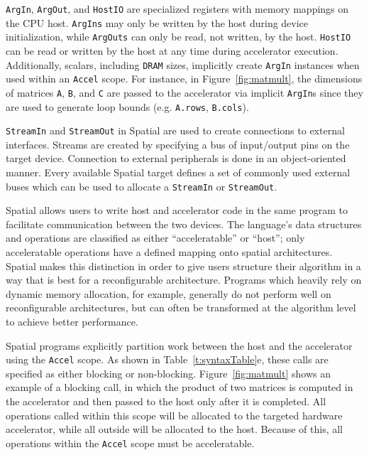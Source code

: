 \texttt{\small{ArgIn}}, \texttt{\small{ArgOut}}, and \texttt{\small{HostIO}} are specialized registers with memory mappings on the CPU host.
\texttt{\small{ArgIns}} may only be written by the host during device initialization, while \texttt{\small{ArgOuts}} can only be read, not written, by the host.
\texttt{\small{HostIO}} can be read or written by the host at any time during accelerator execution.
Additionally, scalars, including \texttt{\small{DRAM}} sizes, implicitly create \texttt{\small{ArgIn}} instances when used within an \texttt{\small{Accel}} scope. For instance, in Figure~\ref{fig:matmult}, the dimensions of matrices \texttt{\small{A}}, \texttt{\small{B}}, and \texttt{\small{C}} are passed to the accelerator via implicit \texttt{\small{ArgIn}}s
since they are used to generate loop bounds (e.g. \texttt{\small{A.rows}}, \texttt{\small{B.cols}}).


\texttt{\small{StreamIn}} and \texttt{\small{StreamOut}} in Spatial are used to create connections to external interfaces.
Streams are created by specifying a bus of input/output pins on the target device.
Connection to external peripherals is done in an object-oriented manner. Every available Spatial target defines a set of commonly used external buses which can be used to allocate a \texttt{\small{StreamIn}} or \texttt{\small{StreamOut}}. %

Spatial allows users to write host and accelerator code in the same program to facilitate communication between the two devices.
The language's data structures and operations are classified as either ``acceleratable'' or ``host''; only acceleratable operations have a defined mapping onto spatial architectures.
Spatial makes this distinction in order to give users structure their algorithm in a way that is best for a reconfigurable architecture.
Programs which heavily rely on dynamic memory allocation, for example, generally do not perform well on reconfigurable architectures, but can often be transformed at the algorithm level to achieve better performance.



Spatial programs explicitly partition work between the host and the accelerator using the \texttt{\small{Accel}} scope. As shown in Table~\ref{t:syntaxTable}e, these calls are specified as either blocking or non-blocking.  Figure~\ref{fig:matmult} shows an example of a blocking call, in which the product of two
matrices is computed in the accelerator and then passed to the host only after it is completed.
All operations called within this scope will be allocated to the targeted hardware accelerator, while all outside will be allocated to the host.
Because of this, all operations within the \texttt{\small{Accel}} scope must be acceleratable.

